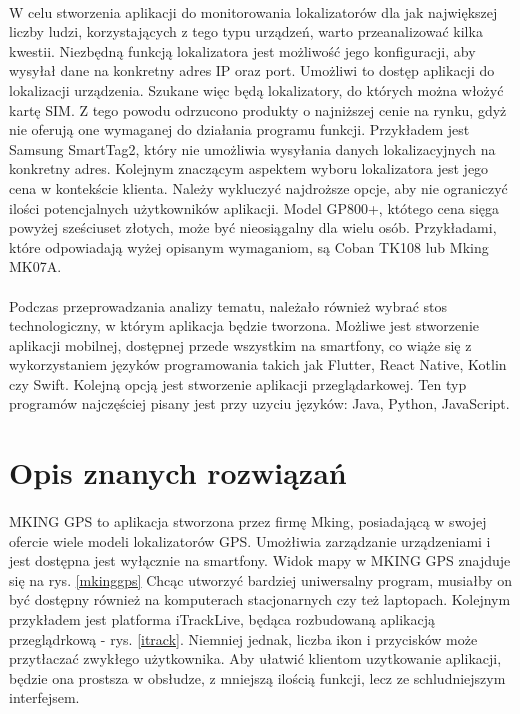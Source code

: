 \paragraph{}
W celu stworzenia aplikacji do monitorowania lokalizatorów dla jak największej liczby ludzi, korzystających z tego typu urządzeń, warto przeanalizować kilka kwestii. Niezbędną funkcją lokalizatora jest możliwość jego konfiguracji, aby wysyłał dane na konkretny adres IP oraz port. Umożliwi to dostęp aplikacji do lokalizacji urządzenia. Szukane więc będą lokalizatory, do których można włożyć kartę SIM. Z tego powodu odrzucono produkty o najniższej cenie na rynku, gdyż nie oferują one wymaganej do działania programu funkcji. Przykładem jest Samsung SmartTag2, który nie umożliwia wysyłania danych lokalizacyjnych na konkretny adres. Kolejnym znaczącym aspektem wyboru lokalizatora jest jego cena w kontekście klienta. Należy wykluczyć najdroższe opcje, aby nie ograniczyć ilości potencjalnych użytkowników aplikacji. Model GP800+, któtego cena sięga powyżej sześciuset złotych, może być nieosiągalny dla wielu osób. Przykładami, które odpowiadają wyżej opisanym wymaganiom, są Coban TK108 lub Mking MK07A.

\paragraph{}
Podczas przeprowadzania analizy tematu, należało również wybrać stos technologiczny, w którym aplikacja będzie tworzona. Możliwe jest stworzenie aplikacji mobilnej, dostępnej przede wszystkim na smartfony, co wiąże się z wykorzystaniem języków programowania takich jak Flutter, React Native, Kotlin czy Swift. Kolejną opcją jest stworzenie aplikacji przeglądarkowej. Ten typ programów najczęściej pisany jest przy uzyciu języków: Java, Python, JavaScript.

\section{Opis znanych rozwiązań}

\paragraph{}
MKING GPS to aplikacja stworzona przez firmę Mking, posiadającą w swojej ofercie wiele modeli lokalizatorów GPS. Umożłiwia zarządzanie urządzeniami i jest dostępna jest wyłącznie na smartfony. Widok mapy w MKING GPS znajduje się na rys. \ref{mkinggps}  Chcąc utworzyć bardziej uniwersalny program, musiałby on być dostępny również na komputerach stacjonarnych czy też laptopach. Kolejnym przykładem jest platforma iTrackLive, będąca rozbudowaną aplikacją przeglądrkową - rys. \ref{itrack}. Niemniej jednak, liczba ikon i przycisków może przytłaczać zwykłego użytkownika. Aby ułatwić klientom uzytkowanie aplikacji, będzie ona prostsza w obsłudze, z mniejszą ilością funkcji, lecz ze schludniejszym interfejsem.

